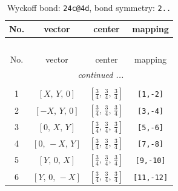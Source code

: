 \documentclass[fleqn,8pt]{jsarticle}
\begin{document}
\renewcommand{\arraystretch}{1.2}
\begin{longtable}{cccc}
\caption{Wyckoff bond: {\tt 24c@4d}, bond symmetry: {\tt 2..}}
 \\
 \hline \hline
No. & vector & center & mapping \\ \hline \endfirsthead

\multicolumn{3}{l}{\tablename\ \thetable{}} \\
 \hline \hline
No. & vector & center & mapping \\ \hline \endhead

 \hline \hline
\multicolumn{3}{r}{\footnotesize\it continued ...} \\ \endfoot

 \hline \hline
\multicolumn{3}{r}{} \\ \endlastfoot

1 & $\left[ X,\, Y,\, 0 \right]$ & $\left[ \frac{3}{4},\, \frac{3}{4},\, \frac{3}{4} \right]$ & {\tt [1,-2]} \\ \hline
2 & $\left[ - X,\, Y,\, 0 \right]$ & $\left[ \frac{3}{4},\, \frac{3}{4},\, \frac{3}{4} \right]$ & {\tt [3,-4]} \\ \hline
3 & $\left[ 0,\, X,\, Y \right]$ & $\left[ \frac{3}{4},\, \frac{3}{4},\, \frac{3}{4} \right]$ & {\tt [5,-6]} \\ \hline
4 & $\left[ 0,\, - X,\, Y \right]$ & $\left[ \frac{3}{4},\, \frac{3}{4},\, \frac{3}{4} \right]$ & {\tt [7,-8]} \\ \hline
5 & $\left[ Y,\, 0,\, X \right]$ & $\left[ \frac{3}{4},\, \frac{3}{4},\, \frac{3}{4} \right]$ & {\tt [9,-10]} \\ \hline
6 & $\left[ Y,\, 0,\, - X \right]$ & $\left[ \frac{3}{4},\, \frac{3}{4},\, \frac{3}{4} \right]$ & {\tt [11,-12]} \\
\end{longtable}
\renewcommand{\arraystretch}{1.2}
\end{document}
